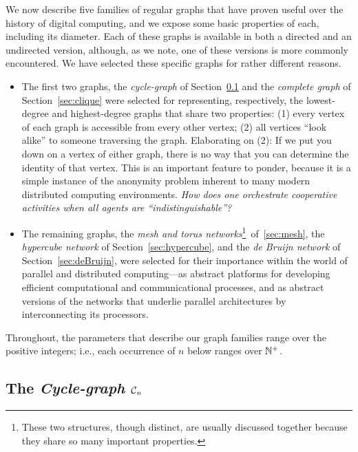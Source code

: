 We now describe five families of regular graphs that have proven
useful over the history of digital computing, and we expose some basic
properties of each, including its diameter.  Each of these graphs is
available in both a directed and an undirected version, although, as
we note, one of these versions is more commonly encountered.  We have
selected these specific graphs for rather different reasons.
\begin{itemize}
\item
The first two graphs, the {\it cycle-graph} of Section~\ref{sec:cycle}
and the {\it complete graph} of Section~\ref{sec:clique} were selected
for representing, respectively, the lowest-degree and highest-degree
graphs that share two properties: (1) every vertex of each graph is
accessible from every other vertex; (2) all vertices ``look alike'' to
someone traversing the graph.  Elaborating on (2): If we put you down
on a vertex of either graph, there is no way that you can determine the
identity of that vertex.  This is an important feature to ponder,
because it is a simple instance of the anonymity problem inherent to
many modern distributed computing environments.
{\it How does one orchestrate cooperative activities when all agents are ``indistinguishable''?}
\item
The remaining graphs, the {\it mesh and torus networks}\footnote{These
  two structures, though distinct, are usually discussed together
  because they share so many important properties.}~of~\ref{sec:mesh},
the {\it hypercube network} of Section~\ref{sec:hypercube}, and the
{\it de Bruijn network} of Section~\ref{sec:deBruijn}, were selected
for their importance within the world of parallel and distributed
computing---as abstract platforms for developing efficient
computational and communicational processes, and as abstract versions
of the networks that underlie parallel architectures by interconnecting its processors.
\end{itemize}
Throughout, the parameters that describe our graph families range over
the positive integers; i.e., each occurrence of $n$ below ranges over $\mathbb{N}^+$.

\subsection{The {\it Cycle-graph} $\mbox{$\cal C$}_n$}
\label{sec:cycle}


